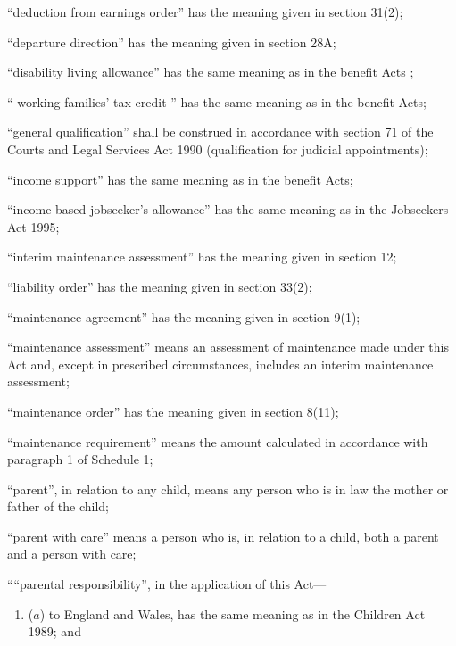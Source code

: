 \documentclass[12pt,a4paper]{article}
\begin{document}
\begin{enumerate}
    “deduction from earnings order” has the meaning given in section 31(2);

“departure direction” has the meaning given in section 28A;

    “disability living allowance” has the same meaning as in the 
benefit Acts%
;

    “%
working families' tax credit%
” has the same meaning as in the benefit Acts;

    “general qualification” shall be construed in accordance with section 71 of the Courts and Legal Services Act 1990 (qualification for judicial appointments);

    “income support” has the same meaning as in the benefit Acts;

“income-based jobseeker’s allowance” has the same meaning as in the Jobseekers Act 1995;

    “interim maintenance assessment” has the meaning given in section 12;

    “liability order” has the meaning given in section 33(2);

    “maintenance agreement” has the meaning given in section 9(1);

    “maintenance assessment” means an assessment of maintenance made under this Act and, except in prescribed circumstances, includes an interim maintenance assessment;

    “maintenance order” has the meaning given in section 8(11);

    “maintenance requirement” means the amount calculated in accordance with paragraph 1 of Schedule 1;

    “parent”, in relation to any child, means any person who is in law the mother or father of the child;

“parent with care” means a person who is, in relation to a child, both a parent and a person with care;


““parental responsibility”, in the application of this Act—
\begin{enumerate}\item[]
($a$) to England and Wales, has the same meaning as in the Children Act 1989; and


\end{enumerate}
\end{enumerate}
\end{document}
